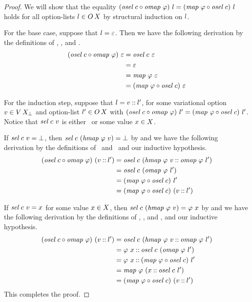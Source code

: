 \begin{proof}
  We will show that the equality
  $
    (\color{black}\textit{osel}\ \color{black}c \circ \color{black}\textit{omap}\ \varphi)\ \color{black}l =
    (\color{black}\textit{map}\ \varphi \circ \color{black}\textit{osel}\ \color{black}c)\ \color{black}l
  $
  holds for all option-lists $\color{black}l \in \color{black}O\,{\color{black}X}$ by structural induction on $\color{black}l$.

  For the base case, suppose that $\color{black}l = \color{black}\varepsilon$.
  Then we have the following derivation by the definitions of \osel, \lmap, and \omap.
  \begin{align*}
    (\color{black}\textit{osel}\ \color{black}c \circ \color{black}\textit{omap}\ \varphi)\ \color{black}\varepsilon
    &= \color{black}\textit{osel}\ \color{black}c\ \color{black}\varepsilon \\
    &= \color{black}\varepsilon \\
    &= \color{black}\textit{map}\ \varphi\ \color{black}\varepsilon \\
    &= (\color{black}\textit{map}\ \varphi \circ \color{black}\textit{osel}\ \color{black}c)\ \color{black}\varepsilon
  \end{align*}

  For the induction step, suppose that $\color{black}l = \color{black}v \mathbin{::} \color{black}l'$, for some variational option $\color{black}v \in \color{black}V\,{\color{black}\color{black}X_{\color{black}\bot}}$ and option-list $\color{black}l' \in \color{black}O\,{\color{black}X}$ with
  $
    (\color{black}\textit{osel}\ \color{black}c \circ \color{black}\textit{omap}\ \varphi)\ \color{black}l' =
    (\color{black}\textit{map}\ \varphi \circ \color{black}\textit{osel}\ \color{black}c)\ \color{black}l'
  $.
  Notice that $\color{black}\textit{sel}\ \color{black}c\ \color{black}v$ is either \Bot\ or some value $\color{black}x\in\color{black}X$.

  If $\color{black}\textit{sel}\ \color{black}c\ \color{black}v = \color{black}\bot$, then $\color{black}\textit{sel}\ \color{black}c\ (\color{black}\textit{hmap}\ \varphi\ \color{black}v) = \color{black}\bot$ by  and we have the following derivation by the definitions of \osel\ and \omap\ and our inductive hypothesis.
  \begin{align*}
    (\osel\ \cE \comp \omap\ \varphi)\ (\var \cons \lst')
    &= \osel\ \cE\ (\hmap\ \varphi\ \var \cons \omap\ \varphi\ \lst') \\
    &= \osel\ \cE\ (\omap\ \varphi\ \lst') \\
    &= (\lmap\ \varphi \comp \osel\ \cE)\ \lst' \\
    &= (\lmap\ \varphi \comp \osel\ \cE)\ (\var \cons \lst')
  \end{align*}

  If $\color{black}\textit{sel}\ \color{black}c\ \color{black}v = \color{black}x$ for some value $\color{black}x \in \color{black}X$, then $\sel\ \cE\ (\hmap\ \varphi\ \var) = \varphi\ \val$ by  and we have the following derivation by the definitions of \osel, \lmap, and \omap, and our inductive hypothesis.
  \begin{align*}
    (\osel\ \cE \comp \omap\ \varphi)\ (\var \cons \lst')
    &= \osel\ \cE\ (\hmap\ \varphi\ \var \cons \omap\ \varphi\ \lst') \\
    &= \varphi\ \val \cons \osel\ \cE\ (\omap\ \varphi\ \lst') \\
    &= \varphi\ \val \cons (\lmap\ \varphi \comp \osel\ \cE)\ \lst' \\
    &= \lmap\ \varphi\ (\val \cons \osel\ \cE\ \lst') \\
    &= (\lmap\ \varphi \comp \osel\ \cE)\ (\var \cons \lst')
  \end{align*}
  This completes the proof.
\end{proof}

